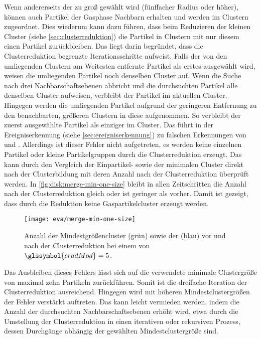 Wenn andererseits der  zu groß gewählt wird (fünffacher Radius oder höher), können auch Partikel der Gasphase Nachbarn erhalten und werden im \CFD Clustern zugeordnet. Dies wiederum kann dazu führen, dass beim Reduzieren der kleinen Cluster (siehe \autoref{sec:clusterreduktion}) die Partikel in Clustern mit nur diesem einen Partikel zurückbleiben. Das liegt darin begründet, dass die Clusterreduktion begrenzte Iterationsschritte aufweist. Falls der von den umliegenden Clustern am Weitesten entfernte Partikel als erstes ausgewählt wird, weisen die umliegenden Partikel noch denselben Cluster auf. Wenn die Suche nach drei Nachbarschaftsebenen abbricht und die durchsuchten Partikel alle denselben Cluster aufweisen, verbleibt der Partikel im aktuellen Cluster. Hingegen werden die umliegenden Partikel aufgrund der geringeren Entfernung zu den benachbarten, größeren Clustern in diese aufgenommen. So verbleibt der zuerst ausgewählte Partikel als einziger im Cluster. Das führt in der Ereigniserkennung (siehe \autoref{sec:ereigniserkennung}) zu falschen Erkennungen von  und .
Allerdings ist dieser Fehler nicht aufgetreten, es werden keine einzelnen Partikel oder kleine Partikelgruppen durch die Clusterreduktion erzeugt. Das kann durch den Vergleich der Einpartikel- sowie der minimalen Cluster direkt nach der Clusterbildung mit deren Anzahl nach der Clusterreduktion überprüft werden. In \autoref{fig:disk:merge-min-one-size} bleibt in allen Zeitschritten die Anzahl nach der Clusterreduktion gleich oder ist geringer als vorher. Damit ist gezeigt, dass durch die Reduktion keine Gaspartikelcluster erzeugt werden.

\begin{figure}
	\texttt{[image: eva/merge-min-one-size]}
	\caption{Anzahl der Mindestgrößencluster (grün) sowie der  (blau) vor und nach der Clusterreduktion bei einem  von $\glssymbol{cradMod} = 5$.}\label{fig:disk:merge-min-one-size}
\end{figure}

Das Ausbleiben dieses Fehlers lässt sich auf die verwendete minimale Clustergröße von maximal zehn Partikeln zurückführen. Somit ist die dreifache Iteration der Clusterreduktion ausreichend. Hingegen wird mit höheren Mindestclustergrößen der Fehler verstärkt auftreten. Das kann leicht vermieden werden, indem die Anzahl der durchsuchten Nachbarschaftsebenen erhöht wird, etwa durch die Umstellung der Clusterreduktion in einen iterativen oder rekursiven Prozess, dessen Durchgänge abhängig der gewählten Mindestclustergröße sind.

